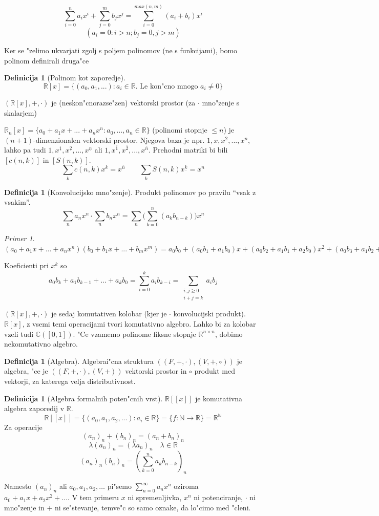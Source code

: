 \documentclass[a4paper,12pt]{article}
\theoremstyle{definition}
\newtheorem{defn}[counter]{Definicija}
\theoremstyle{remark}
\newtheorem*{ex}{Primer}
\newcommand{\N}{\mathbb{N}}
\newcommand{\R}{\mathbb{R}}
\newcommand{\C}{\mathbb{C}}
\begin{document}
\[\sum_{i = 0}^n a_i x^{i} + \sum_{j = 0}^m b_j x^j = \sum_{i = 0}^{max(n, m)}(a_i + b_i)x^{i}\]
\[(a_i = 0: i > n; b_j = 0, j > m)\]

Ker se "zelimo ukvarjati zgolj s poljem polinomov (ne s funkcijami), bomo polinom definirali druga"ce
\begin{defn}[Polinom kot zaporedje]
	\[\R[x] = \{(a_0, a_1, ...): a_i \in \R. \text{ Le kon"cno mnogo }a_i \neq 0\}\]
\end{defn}

$(\R[x], +, \cdot)$ je (neskon"cnorazse"zen) vektorski prostor (za $\cdot$ mno"zenje s skalarjem)

$\R_n[x] = \{a_0 + a_1 x + ... + a_n x^n: a_0, ..., a_n \in \R\}$ (polinomi stopnje $\leqslant n$) je $(n + 1)$-dimenzionalen vektorski prostor. Njegova baza je npr. $1, x, x^2, ..., x^n$, lahko pa tudi $1, x^{\underline{1}}, x^{\underline{2}}, ..., x^{\underline{n}}$ ali $1, x^{\overline{1}}, x^{\overline{2}}, ..., x^{\overline{n}}$. Prehodni matriki bi bili $[c(n, k)]$ in $[S(n, k)]$.
\[
	\sum_k c(n, k) x^k = x^{\overline{n}}
	\qquad
	\sum_k S(n, k) x^{\underline{k}} = x^n
\]

\begin{defn}[Konvolucijsko mno"zenje]
	Produkt polinomov po pravilu ``vsak z vsakim''.
	\[\sum_na_nx^n \cdot \sum_nb_nx^n = \sum_n\big(\sum_{k=0}^n(a_kb_{n-k})\big)x^n\]
\end{defn}
\begin{ex}
	$(a_0 + a_1 x + ... + a_n x^n)(b_0 + b_1 x + ... + b_m x^m) = a_0 b_0 + (a_0 b_1 + a_1 b_0)x + (a_0 b_2 + a_1 b_ 1 + a_2 b_0) x^2 + (a_0 b_3 + a_1 b_2 + a_2 b_1 + a_3 b_0)x^3 + ... + a_n b_m x^{n + m}$
\end{ex}
Koeficienti pri $x^k$ so
\[a_0 b_k + a_1 b_{k - 1} + ... + a_k b_0 = \sum_{i = 0}^k a_i b_{k - i} = \sum_{\substack{i, j \geqslant 0 \\ i + j = k}} a_i b_j\]

$(\R[x], +, \cdot)$ je sedaj komutativen kolobar (kjer je $\cdot$ konvolucijski produkt). $\R[x]$, z vsemi temi operacijami tvori komutativno algebro. Lahko bi za kolobar vzeli tudi $\C([0, 1])$. "Ce vzamemo polinome fiksne stopnje $\R^{n \times n}$, dobimo nekomutativno algebro.

\begin{defn}[Algebra]
	Algebrai"cna struktura $((F, +, \cdot), (V, +, \circ))$ je algebra, "ce je $((F, +, \cdot), (V, +))$ vektorski prostor in $\circ$ produkt med vektorji, za katerega velja distributivnost.
\end{defn}
\begin{defn}[Algebra formalnih poten"cnih vrst]
    $\R[[x]]$ je komutativna algebra zaporedij v $\R$.
    \[\R[[x]] = \{(a_0, a_1, a_2, ...): a_i \in \R\} = \{f: \N \rightarrow \R\} = \R^{\N}\]
	Za operacije
    \[(a_n)_n + (b_n)_n = (a_n + b_n)_n\]
    \[\lambda(a_n)_n = (\lambda a_n)_n \quad \lambda \in \R \]
    \[(a_n)_n (b_n)_n = (\sum_{k = 0}^n a_k b_{n - k})_n\]
\end{defn}
Namesto $(a_n)_n$ ali $a_0, a_1, a_2, \ldots$ pi"semo $\sum_{n = 0}^{\infty} a_n x^n$ oziroma $a_0 + a_1 x + a_2 x^2 + ...$. V tem primeru $x$ ni spremenljivka, $x^n$ ni potenciranje, $\cdot$ ni mno"zenje in $+$ ni se"stevanje, temve"c so samo oznake, da lo"cimo med "cleni.
\end{document}
